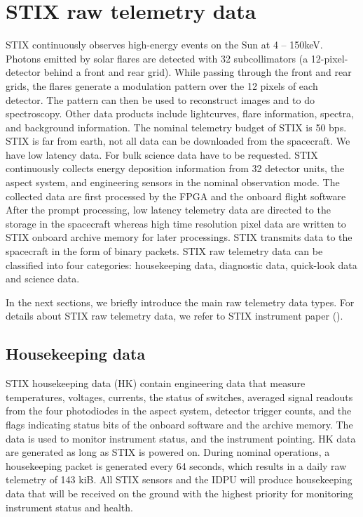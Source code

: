 \documentclass{aa}
\begin{document}
\section{STIX raw telemetry data}
\label{sec:raw-data}
STIX continuously observes high-energy events on the Sun at 4 -- 150keV. 
Photons emitted by solar flares are detected with 32 subcollimators 
(a 12-pixel-detector behind a front and rear grid). While passing through the front and rear grids, 
the flares generate a modulation pattern over the 12 pixels of each detector. 
The pattern can then be used to reconstruct images and to do spectroscopy. 
Other data products include lightcurves, flare information, spectra, and background information.
The nominal telemetry budget of STIX is 50 bps.
STIX is far from earth, not all data can be downloaded from the spacecraft. We have low latency data.
For bulk science data have to be requested.
STIX continuously collects energy deposition information from 32 detector units, the aspect system,
and engineering sensors in the nominal observation mode.
The collected data are first processed by the FPGA and the onboard flight software
After the prompt processing, low latency telemetry data are directed to the
storage in the spacecraft whereas high time resolution pixel data are written to STIX onboard archive memory for
later processings.
STIX transmits data to the spacecraft in the form of binary packets.
STIX raw telemetry data can be classified into four
categories: housekeeping data, diagnostic data, quick-look data and science data.

In the next sections, we briefly introduce the main raw telemetry data types.
For details about STIX raw telemetry data, we refer to STIX instrument paper (\cite{StixInstrument}).

\subsection{Housekeeping data}
STIX housekeeping data (HK) contain engineering data that measure temperatures, voltages, currents, the status of switches,
averaged signal readouts from the four photodiodes in the aspect system, detector trigger counts, and the flags indicating
status bits of the onboard software and the archive memory.
The data is used to monitor instrument status, and the instrument pointing.
HK data are generated as long as STIX is powered on.
During nominal operations, a housekeeping packet is generated every 64 seconds, which results in a daily raw telemetry of  143 kiB.
All STIX sensors and the IDPU will produce housekeeping data that will be received on the ground with the highest priority
for monitoring instrument status and health.
\end{document}
